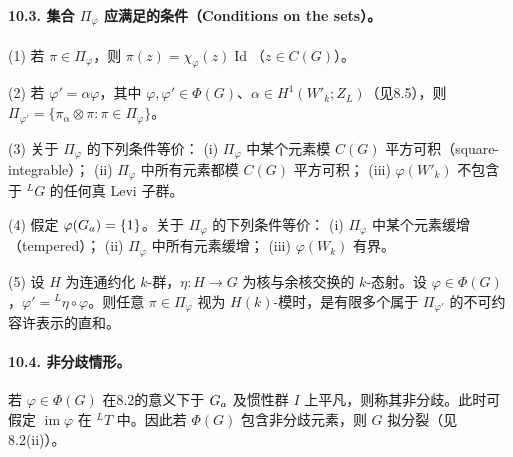 \paragraph*{10.3. 集合 $\Pi_\varphi$ 应满足的条件（Conditions on the sets）。}
(1) 若 $\pi\in\Pi_\varphi$，则 $\pi(z)=\chi_\varphi(z)\operatorname{Id}$（$z\in C(G)$）。

(2) 若 $\varphi'=\alpha\varphi$，其中 $\varphi,\varphi'\in\Phi(G)$、$\alpha\in H^1(W'_k;Z_L)$（见8.5），则 $\Pi_{\varphi'}=\{\pi_\alpha\otimes\pi:\pi\in\Pi_\varphi\}$。

(3) 关于 $\Pi_\varphi$ 的下列条件等价：
(i) $\Pi_\varphi$ 中某个元素模 $C(G)$ 平方可积（square-integrable）；
(ii) $\Pi_\varphi$ 中所有元素都模 $C(G)$ 平方可积；
(iii) $\varphi(W'_k)$ 不包含于 ${}^LG$ 的任何真 Levi 子群。

(4) 假定 $\varphi(G_{a})=\{1\}$。关于 $\Pi_\varphi$ 的下列条件等价：
(i) $\Pi_\varphi$ 中某个元素缓增（tempered）；
(ii) $\Pi_\varphi$ 中所有元素缓增；
(iii) $\varphi(W_k)$ 有界。

(5) 设 $H$ 为连通约化 $k$-群，$\eta:H\to G$ 为核与余核交换的 $k$-态射。设 $\varphi\in\Phi(G)$，$\varphi'={}^L\eta\circ\varphi$。则任意 $\pi\in\Pi_\varphi$ 视为 $H(k)$-模时，是有限多个属于 $\Pi_{\varphi'}$ 的不可约容许表示的直和。

\paragraph*{10.4. 非分歧情形。}
若 $\varphi\in\Phi(G)$ 在8.2的意义下于 $G_{a}$ 及惯性群 $I$ 上平凡，则称其非分歧。此时可假定 $\operatorname{im}\varphi$ 在 ${}^LT$ 中。因此若 $\Phi(G)$ 包含非分歧元素，则 $G$ 拟分裂（见8.2(ii)）。

